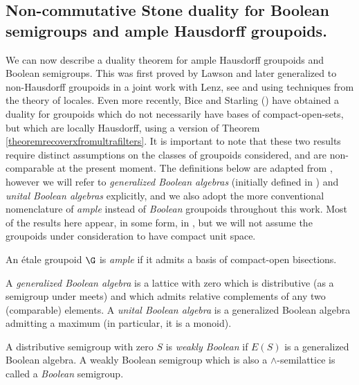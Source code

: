 \subsection{Non-commutative Stone duality for Boolean semigroups and ample Hausdorff groupoids.}

We can now describe a duality theorem for ample Hausdorff groupoids and Boolean semigroups. This was first proved by Lawson and later generalized to non-Hausdorff groupoids in a joint work with Lenz, see \cite{MR2827424} and \cite{MR3077869} using techniques from the theory of locales. Even more recently, Bice and Starling (\cite{arxiv1803.00394v2}) have obtained a duality for groupoids which do not necessarily have bases of compact-open-sets, but which are locally Hausdorff, using a version of Theorem \ref{theoremrecoverxfromultrafilters}. It is important to note that these two results require distinct assumptions on the classes of groupoids considered, and are non-comparable at the present moment. The definitions below are adapted from \cite{MR3077869}, however we will refer to \emph{generalized Boolean algebras} (initially defined in \cite{MR1507106}) and \emph{unital Boolean algebras} explicitly, and we also adopt the more conventional nomenclature of \emph{ample} instead of \emph{Boolean} groupoids throughout this work. Most of the results here appear, in some form, in \cite{MR2827424}, but we will not assume the groupoids under consideration to have compact unit space.

\begin{definition}
An étale groupoid $\G$ is \emph{ample} if it admits a basis of compact-open bisections.
\end{definition}

\begin{definition}\label{definitionbooleanalgebra}
A \emph{generalized Boolean algebra} is a lattice with zero which is distributive (as a semigroup under meets) and which admits relative complements of any two (comparable) elements. A \emph{unital Boolean algebra} is a generalized Boolean algebra admitting a maximum (in particular, it is a monoid).
\end{definition}

\begin{definition}[{\cite[3.4]{MR3077869}}]\label{definitionbooleaninversesemigroup}
A distributive semigroup with zero $S$ is \emph{weakly Boolean} if $E(S)$ is a generalized Boolean algebra. A weakly Boolean semigroup which is also a $\wedge$-semilattice is called a \emph{Boolean} semigroup.
\end{definition}

